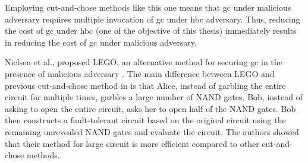 Employing cut-and-chose methods like this one means that \acrshort{gc} under malicious adversary requires multiple invocation of \acrshort{gc} under \acrshort{hbc} adversary.
Thus, reducing the cost of \acrshort{gc} under \acrshort{hbc} (one of the objective of this thesis) immediately results in reducing the cost of \acrshort{gc} under malicious adversary.

Nielsen et al., proposed LEGO, an alternative method for securing \acrshort{gc} in the presence of malicious adversary \cite{nielsen2009lego}.
The main difference between LEGO and previous cut-and-chose method in \cite{lindell2007efficient, lindell2012secure} is that Alice, instead of garbling the entire circuit for multiple times, garbles a large number of NAND gates.
Bob, instead of asking to open the entire circuit, asks her to open half of the NAND gates.
Bob then constructs a fault-tolerant circuit based on the original circuit using the remaining unrevealed NAND gates and evaluate the circuit.
The authors showed that their method for large circuit is more efficient compared to other cut-and-chose methods.
